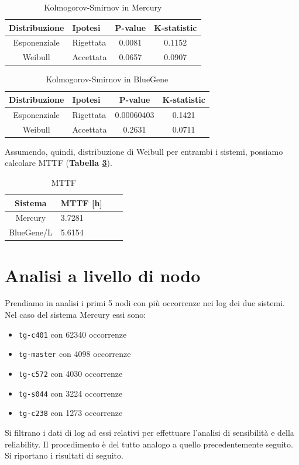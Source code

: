 	\begin{table}
		\footnotesize
		\caption{Kolmogorov-Smirnov in Mercury}
		\label{tab:ffda-gofM}
		\centering
		\begin{tabular}{clcc}
			\toprule
			\textbf{Distribuzione} &
			\textbf{Ipotesi} &
			\textbf{P-value} &
			\textbf{K-statistic}\\
			\midrule
			Esponenziale &
			Rigettata &
			0.0081 &
			0.1152\\
			\midrule
			Weibull &
			Accettata &
			0.0657 &
			0.0907\\
			\bottomrule			
		\end{tabular}
	\end{table}
	\begin{table}
		\footnotesize
		\caption{Kolmogorov-Smirnov in BlueGene}
		\label{tab:ffda-gofBG}
		\centering
		\begin{tabular}{clcc}
			\toprule
			\textbf{Distribuzione} &
			\textbf{Ipotesi} &
			\textbf{P-value} &
			\textbf{K-statistic}\\
			\midrule
			Esponenziale &
			Rigettata &
			0.00060403 &
			0.1421\\
			\midrule
			Weibull &
			Accettata &
			0.2631 &
			0.0711\\
			\bottomrule			
		\end{tabular}
	\end{table}

	Assumendo, quindi, distribuzione di Weibull per entrambi i sistemi, possiamo calcolare MTTF (\textbf{Tabella \ref{tab:ffda-mttf}}).
	\begin{table}
		\footnotesize
		\caption{MTTF}
		\label{tab:ffda-mttf}
		\centering
		\begin{tabular}{clcc}
			\toprule
			\textbf{Sistema} &
			\textbf{MTTF [h]}\\
			\midrule
			Mercury &
			3.7281\\
			\midrule
			BlueGene/L &
			5.6154\\
			\bottomrule			
		\end{tabular}
	\end{table}
	
	
	\section{Analisi a livello di nodo}
		Prendiamo in analisi i primi 5 nodi con più occorrenze nei log dei due sistemi.
		Nel caso del sistema Mercury essi sono:
		\begin{itemize}
			\item \texttt{tg-c401} con 62340 occorrenze
			\item \texttt{tg-master} con 4098 occorrenze
			\item \texttt{tg-c572} con 4030 occorrenze
			\item \texttt{tg-s044} con 3224 occorrenze
			\item \texttt{tg-c238} con 1273 occorrenze
		\end{itemize}
		   Si filtrano i dati di log ad essi relativi per effettuare l'analisi di sensibilità e della reliability. Il procedimento è del tutto analogo a quello precedentemente seguito. Si riportano i risultati di seguito.
		
